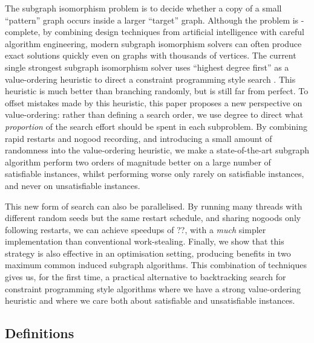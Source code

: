 \documentclass[runningheads]{llncs}
\newcommand{\neighbourhood}{\operatorname{N}}
\newcommand{\vertexset}{\operatorname{V}}
\newcommand{\citet}[2]{#1\cite{#2}}
\begin{document}
The subgraph isomorphism problem is to decide whether a copy of a small ``pattern'' graph occurs
inside a larger ``target'' graph. Although the problem is \NP-complete, by combining design
techniques from artificial intelligence with careful algorithm engineering, modern subgraph
isomorphism solvers can often produce exact solutions quickly even on graphs with thousands of
vertices. The current single strongest subgraph isomorphism solver uses ``highest degree first'' as
a value-ordering heuristic to direct a constraint programming style search
\cite{DBLP:conf/cp/McCreeshP15,DBLP:conf/lion/KotthoffMS16,DBLP:journals/jair/McCreeshPST18}. This
heuristic is much better than branching randomly, but is still far from perfect. To offset mistakes
made by this heuristic, this paper proposes a new perspective on value-ordering: rather than
defining a search order, we use degree to direct what \emph{proportion} of the search effort should
be spent in each subproblem. By combining rapid restarts and nogood recording, and introducing a
small amount of randomness into the value-ordering heuristic, we make a state-of-the-art subgraph
algorithm perform two orders of magnitude better on a large number of satisfiable instances, whilst
performing worse only rarely on satisfiable instances, and never on unsatisfiable instances.

This new form of search can also be parallelised. By running many threads with different random
seeds but the same restart schedule, and sharing nogoods only following restarts, we can achieve
speedups of ??, with a \emph{much} simpler implementation than conventional work-stealing.  Finally,
we show that this strategy is also effective in an optimisation setting, producing benefits in two
maximum common induced subgraph algorithms. This combination of techniques gives us, for the first
time, a practical alternative to backtracking search for constraint programming style algorithms
where we have a strong value-ordering heuristic and where we care both about satisfiable and
unsatisfiable instances.

\subsection{Definitions}

\end{document}
